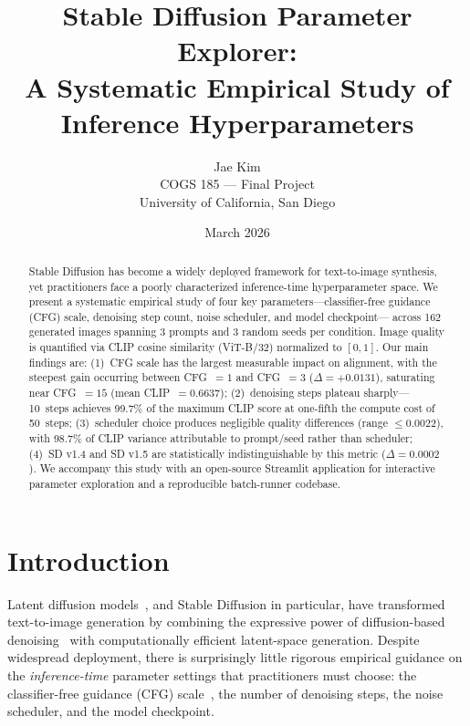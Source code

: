 \documentclass{article}
\title{\textbf{Stable Diffusion Parameter Explorer:\\
A Systematic Empirical Study of Inference Hyperparameters}}
\author{Jae Kim\\
COGS 185 --- Final Project\\
University of California, San Diego}
\date{March 2026}
\begin{document}
\maketitle

\begin{abstract}
Stable Diffusion has become a widely deployed framework for text-to-image synthesis,
yet practitioners face a poorly characterized inference-time hyperparameter space.
We present a systematic empirical study of four key parameters---classifier-free
guidance (CFG) scale, denoising step count, noise scheduler, and model checkpoint---
across 162 generated images spanning 3 prompts and 3 random seeds per condition.
Image quality is quantified via CLIP cosine similarity (ViT-B/32)
normalized to $[0, 1]$.
Our main findings are: (1)~CFG scale has the largest measurable impact on alignment,
with the steepest gain occurring between CFG~$= 1$ and CFG~$= 3$ ($\Delta{=}+0.0131$),
saturating near CFG~$= 15$ (mean CLIP~$= 0.6637$);
(2)~denoising steps plateau sharply---10~steps achieves 99.7\% of the maximum
CLIP score at one-fifth the compute cost of 50~steps;
(3)~scheduler choice produces negligible quality differences (range $\leq 0.0022$),
with 98.7\% of CLIP variance attributable to prompt/seed rather than scheduler;
(4)~SD v1.4 and SD v1.5 are statistically indistinguishable by this metric
($\Delta{=}0.0002$).
We accompany this study with an open-source Streamlit application for interactive
parameter exploration and a reproducible batch-runner codebase.
\end{abstract}

\section{Introduction}

Latent diffusion models~\citep{rombach2022ldm}, and Stable Diffusion in particular,
have transformed text-to-image generation by combining the expressive power of
diffusion-based denoising~\citep{ho2020ddpm} with computationally efficient
latent-space generation.
Despite widespread deployment, there is surprisingly little rigorous empirical
guidance on the \emph{inference-time} parameter settings that practitioners
must choose: the classifier-free guidance (CFG) scale~\citep{ho2022cfg},
the number of denoising steps, the noise scheduler, and the model checkpoint.
\end{document}
